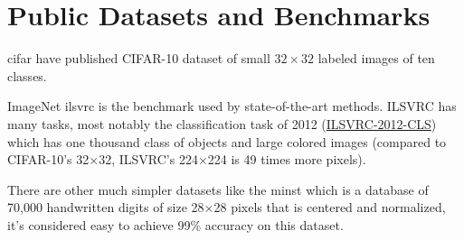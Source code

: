 \section{Public Datasets and Benchmarks}
\gls{cifar} have published CIFAR-10\autocite{krizhevsky2009learning}
dataset of small \( 32\times 32 \) labeled images of ten classes.

ImageNet\autocite{deng2009imagenet} \gls{ilsvrc}\autocite{deng2012imagenet}\autocite{krizhevsky2012imagenet}
is the benchmark used by state-of-the-art methods.
ILSVRC has many tasks, most notably the classification task of 2012
(\href{http://www.image-net.org/challenges/LSVRC/2012/}{ILSVRC-2012-CLS})
which has one thousand class of objects and large colored images
(compared to CIFAR-10's 32×32, ILSVRC’s 224×224 is 49 times more pixels).

There are other much simpler datasets like the \gls{minst}\autocite{lecun2010mnist}\autocite{lecun1998gradient}
which is a database of 70,000 handwritten digits of size 28×28 pixels that is centered and normalized,
it’s considered easy to achieve 99\% accuracy on this dataset. 

